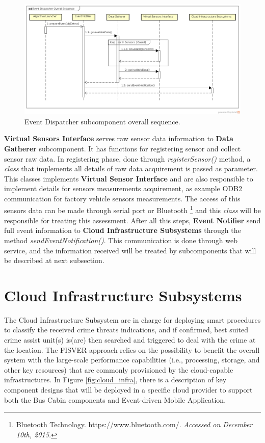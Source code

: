 \begin{figure}[htb!]
 	\centering
 	\includegraphics[scale=0.45]{Imagens/cap4_evtdsp.png}
 	\caption{Event Dispatcher subcomponent overall sequence.}
 	\label{fig:evtseq}
\end{figure}

\textbf{Virtual Sensors Interface} serves raw sensor data information to \textbf{Data Gatherer} subcomponent. It has functions for registering sensor and collect sensor raw data. In registering phase, done through \textit{registerSensor()} method, a \textit{class} that implements all details of raw data acquirement is passed as parameter. This classes implements \textbf{Virtual Sensor Interface} and are also responsible to implement details for sensors measurements acquirement, as example ODB2 communication for factory vehicle sensors measurements. The access of this sensors data can be made through serial port or Bluetooth \footnote[20]{Bluetooth Technology. https://www.bluetooth.com/. \textit{Accessed on December 10th, 2015.}} and this \textit{class} will be responsible for treating this assessment. After all this steps, \textbf{Event Notifier} send full event information to \textbf{Cloud Infrastructure Subsystems} through the method \textit{sendEventNotification()}. This communication is done through web service, and the information received will be treated by subcomponents that will be described at next subsection.


\section{Cloud Infrastructure Subsystems}

The Cloud Infrastructure Subsystem are in charge for deploying smart procedures to classify the received crime threats indications, and if confirmed, best suited crime assist unit(s) is(are) then searched and triggered to deal with the crime at the location. The FISVER approach relies on the possibility to benefit the overall system with the large-scale performance capabilities (i.e., processing, storage, and other key resources) that are commonly provisioned by the cloud-capable infrastructures. In Figure \ref{fig:cloud_infra}, there is a description of key component designs that will be deployed in a specific cloud provider to support both the Bus Cabin components and Event-driven Mobile Application.

